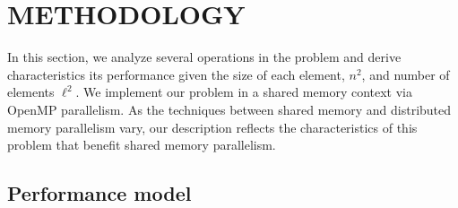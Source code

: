 % 
% 
%
\section{METHODOLOGY}

%
%
%
In this section, we analyze several operations in the problem and derive characteristics its performance given the size of each element, $n^2$, and number of elements $\ell^2$.
We implement our problem in a shared memory context via OpenMP \citep{openmp08} parallelism.
As the techniques between shared memory and distributed memory parallelism vary, our description reflects the characteristics of this problem that benefit shared memory parallelism.

%
%
%
\subsection{Performance model} 


%
%
%
%

% 




